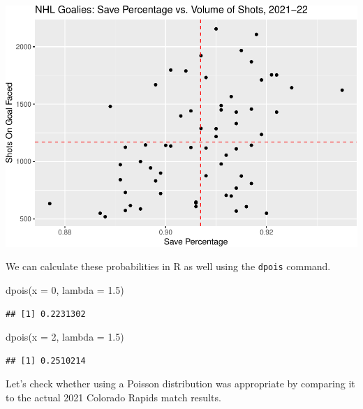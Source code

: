 \documentclass[
  11pt,
]{book}
\newenvironment{Shaded}{\begin{snugshade}}{\end{snugshade}}
\newcommand{\AttributeTok}[1]{\textcolor[rgb]{0.77,0.63,0.00}{#1}}
\newcommand{\DecValTok}[1]{\textcolor[rgb]{0.00,0.00,0.81}{#1}}
\newcommand{\FloatTok}[1]{\textcolor[rgb]{0.00,0.00,0.81}{#1}}
\newcommand{\FunctionTok}[1]{\textcolor[rgb]{0.00,0.00,0.00}{#1}}
\newcommand{\NormalTok}[1]{#1}
\theoremstyle{definition}
\theoremstyle{definition}
\theoremstyle{definition}
\theoremstyle{definition}
\theoremstyle{remark}
\begin{document}
\includegraphics{series_files/figure-latex/unnamed-chunk-29-1.pdf}

We can calculate these probabilities in R as well using the \texttt{dpois} command.

\begin{Shaded}
\begin{Highlighting}[]
\FunctionTok{dpois}\NormalTok{(}\AttributeTok{x =} \DecValTok{0}\NormalTok{, }\AttributeTok{lambda =} \FloatTok{1.5}\NormalTok{)}
\end{Highlighting}
\end{Shaded}

\begin{verbatim}
## [1] 0.2231302
\end{verbatim}

\begin{Shaded}
\begin{Highlighting}[]
\FunctionTok{dpois}\NormalTok{(}\AttributeTok{x =} \DecValTok{2}\NormalTok{, }\AttributeTok{lambda =} \FloatTok{1.5}\NormalTok{)}
\end{Highlighting}
\end{Shaded}

\begin{verbatim}
## [1] 0.2510214
\end{verbatim}

Let's check whether using a Poisson distribution was appropriate by comparing it to the actual 2021 Colorado Rapids match results.
\end{document}
